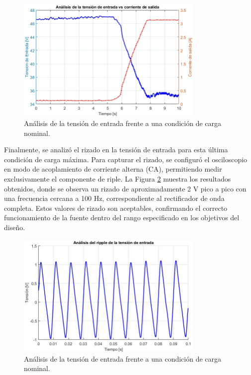 \begin{figure}[htbp]
    \centering
    \includegraphics[width=0.8\textwidth]{./imagenes/Vrec_Isal.jpg}
    \caption{Análisis de la tensión de entrada frente a una condición de carga nominal.}
    \label{F:Vrec_Isal}
\end{figure}\par 

Finalmente, se analizó el rizado en la tensión de entrada para esta última condición de carga máxima. Para capturar el rizado, se configuró el osciloscopio en modo de acoplamiento de corriente alterna (CA), permitiendo medir exclusivamente el componente de riple. La Figura \ref{F:ripple} muestra los resultados obtenidos, donde se observa un rizado de aproximadamente 2 V pico a pico con una frecuencia cercana a 100 Hz, correspondiente al rectificador de onda completa. Estos valores de rizado son aceptables, confirmando el correcto funcionamiento de la fuente dentro del rango especificado en los objetivos del diseño.

\begin{figure}[htbp]
    \centering
    \includegraphics[width=0.8\textwidth]{./imagenes/ripple.jpg}
    \caption{Análisis de la tensión de entrada frente a una condición de carga nominal.}
    \label{F:ripple}
\end{figure}\par 


